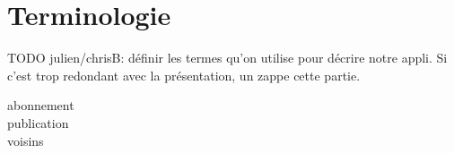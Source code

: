 
\section{Terminologie}

TODO julien/chrisB: définir les termes qu'on utilise pour décrire notre appli. Si c'est trop redondant avec la présentation, un zappe cette partie.

\begin{description}
	\item[abonnement]
	\item[publication]
	\item[voisins]
\end{description}

